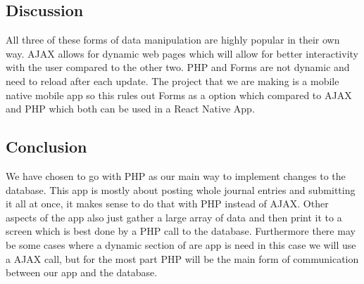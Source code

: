 \documentclass[compsoc, 10, draftclsnofoot, onecolumn]{IEEEtran}
\begin{document}
\subsection{Discussion} All three of these forms of data manipulation are highly popular in their own way. AJAX allows for dynamic web pages which will allow for better interactivity with the user compared to the other two. PHP and Forms are not dynamic and need to reload after each update. The project that we are making is a mobile native mobile app so this rules out Forms as a option which compared to AJAX and PHP which both can be used in a React Native App. 
\subsection{Conclusion} We have chosen to go with PHP as our main way to implement changes to the database. This app is mostly about posting whole journal entries and submitting it all at once, it makes sense to do that with PHP instead of AJAX. Other aspects of the app also just gather a large array of data and then print it to a screen which is best done by a PHP call to the database. Furthermore there may be some cases where a dynamic section of are app is need in this case we will use a AJAX call, but for the most part PHP will be the main form of communication between our app and the database.   
\clearpage


\end{document}

